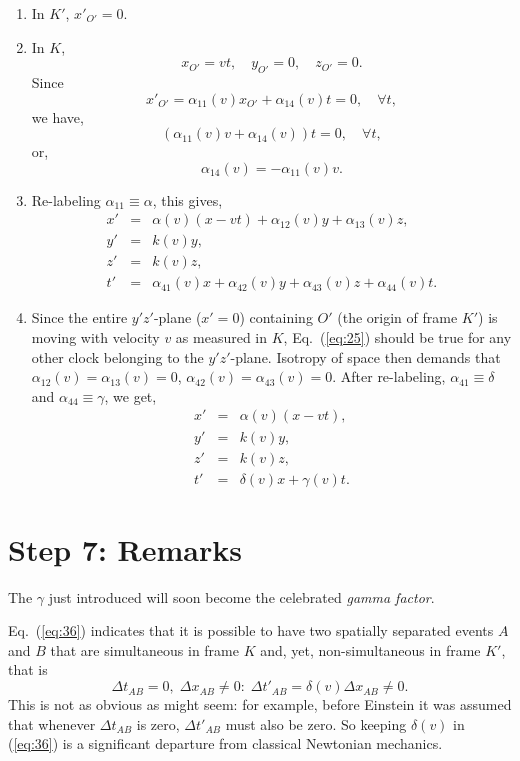 \documentclass[twocolumn,preprintnumbers,amsmath,amssymb,final]{revtex4}
\def\BEq{\begin{equation}}
\def\EEq{\end{equation}}
\def\BEqA{\begin{eqnarray}}
\def\EEqA{\end{eqnarray}}
\def\a{\alpha}
\def\d{\delta}
\def\g{\gamma}
\begin{document}
\begin{enumerate}

\item In $K'$, $x'_{O'} = 0$. 

\item In $K$, 
\BEq
x_{O'}=vt, \quad y_{O'}=0, \quad z_{O'}=0.
\EEq
Since
\BEq
x'_{O'} = \a_{11}(v)x_{O'}+\a_{14}(v)t = 0, \quad \forall t,
\EEq
we have,
\BEq
(\a_{11}(v)v+\a_{14}(v))t = 0, \quad \forall t,
\EEq
or,
\BEq
\a_{14}(v)=- \a_{11}(v)v.
\EEq

\item Re-labeling $\a_{11}\equiv \a$,
this gives,
\BEqA
\label{eq:25}
x'&=&\a(v)(x - vt)+\a_{12}(v)y+\a_{13}(v)z,
\\
y'&=&k(v)y,
\\
z'&=&k(v)z,
\\
t'&=&\a_{41}(v)x+\a_{42}(v)y+\a_{43}(v)z+\a_{44}(v)t.
\EEqA

\item Since the entire $y'z'$-plane ($x'=0$) containing $O'$ (the origin of frame $K'$) is moving with velocity $v$ as measured in $K$, Eq.\ (\ref{eq:25}) should be true for any other clock belonging to the $y'z'$-plane. Isotropy of space then demands that 
$\a_{12}(v)=\a_{13}(v)=0$, $\a_{42}(v)=\a_{43}(v)=0$. After
re-labeling, $\a_{41}\equiv \d$ and $\a_{44}\equiv \g$, we get,
\BEqA
x'&=&\a(v)(x - vt),
\\
y'&=&k(v)y,
\\
z'&=&k(v)z,
\\
\label{eq:36}
t'&=&\d(v)x+\g(v)t.
\EEqA

\end{enumerate}


\section*{Step 7: Remarks}

 The $\g$ just introduced will soon become the celebrated 
{\it gamma factor}.

\vskip10pt

 Eq.\ (\ref{eq:36}) indicates that it is possible to have two spatially separated events $A$ and $B$ 
that are simultaneous in frame $K$ and, yet, non-simultaneous in frame $K'$, that is
\BEq
\label{eq:9}
\Delta t_{AB} = 0, \; \Delta x_{AB} \neq 0: \; \Delta t'_{AB} = \d(v)\Delta x_{AB}\neq 0.
\EEq
This is not as obvious as might seem: for example, before Einstein it was assumed that whenever 
$\Delta t_{AB}$ is zero, $\Delta t'_{AB}$ must also be zero. So keeping $\d(v)$ in (\ref{eq:36}) 
is a significant departure from classical Newtonian
mechanics. 
\end{document}
